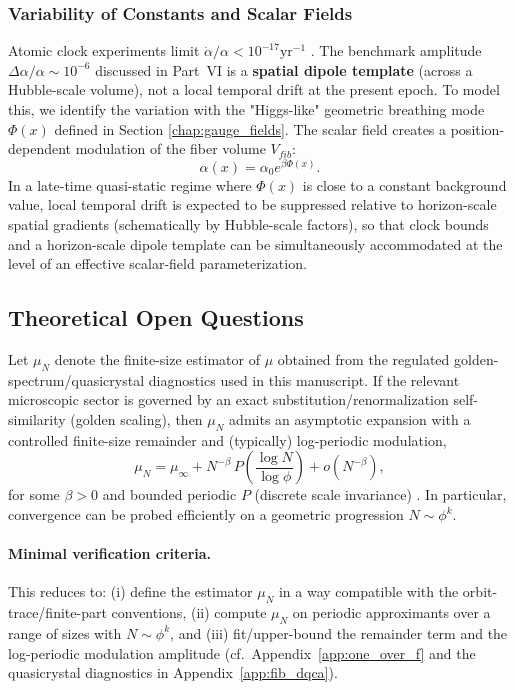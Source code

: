 \subsubsection{Variability of Constants and Scalar Fields}
Atomic clock experiments limit $\dot{\alpha}/\alpha < 10^{-17} \text{yr}^{-1}$ \cite{Rosenband2008}. The benchmark amplitude $\Delta \alpha/\alpha \sim 10^{-6}$ discussed in Part~VI is a \textbf{spatial dipole template} (across a Hubble-scale volume), not a local temporal drift at the present epoch.
To model this, we identify the variation with the "Higgs-like" geometric breathing mode $\Phi(x)$ defined in Section \ref{chap:gauge_fields}. The scalar field creates a position-dependent modulation of the fiber volume $V_{fib}$:
\begin{equation}
    \alpha(x) = \alpha_0 e^{\beta \Phi(x)}.
\end{equation}
In a late-time quasi-static regime where $\Phi(x)$ is close to a constant background value, local temporal drift is expected to be suppressed relative to horizon-scale spatial gradients (schematically by Hubble-scale factors), so that clock bounds and a horizon-scale dipole template can be simultaneously accommodated at the level of an effective scalar-field parameterization.

\subsection{Theoretical Open Questions}
\begin{conjecture}
\label{conj:mu_scaling}
Let $\mu_N$ denote the finite-size estimator of $\mu$ obtained from the regulated golden-spectrum/quasicrystal diagnostics used in this manuscript. If the relevant microscopic sector is governed by an exact substitution/renormalization self-similarity (golden scaling), then $\mu_N$ admits an asymptotic expansion with a controlled finite-size remainder and (typically) log-periodic modulation,
\begin{equation}
    \mu_N = \mu_\infty + N^{-\beta}\,P\!\left(\frac{\log N}{\log\phi}\right) + o(N^{-\beta}),
\end{equation}
for some $\beta>0$ and bounded periodic $P$ (discrete scale invariance) \cite{Sornette1998DSI}. In particular, convergence can be probed efficiently on a geometric progression $N\sim \phi^k$.\par
\end{conjecture}
\paragraph{Minimal verification criteria.}
This reduces to: (i) define the estimator $\mu_N$ in a way compatible with the orbit-trace/finite-part conventions, (ii) compute $\mu_N$ on periodic approximants over a range of sizes with $N\sim \phi^k$, and (iii) fit/upper-bound the remainder term and the log-periodic modulation amplitude (cf.\ Appendix~\ref{app:one_over_f} and the quasicrystal diagnostics in Appendix~\ref{app:fib_dqca}).

